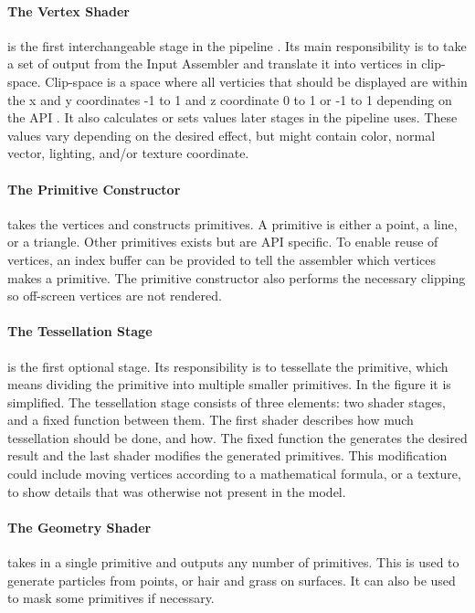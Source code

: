 \paragraph{The Vertex Shader} is the first interchangeable stage in the pipeline .
Its main responsibility is to take a set of output from the Input Assembler and translate it into vertices in clip-space.
Clip-space is a space where all verticies that should be displayed are within the x and y coordinates -1 to 1 and z coordinate 0 to 1 or -1 to 1 depending on the \gls{API} .
It also calculates or sets values later stages in the pipeline uses.
These values vary depending on the desired effect, but might contain color, normal vector, lighting, and/or texture coordinate.

\paragraph{The Primitive Constructor} takes the vertices and constructs primitives.
A primitive is either a point, a line, or a triangle.
Other primitives exists but are \gls{API} specific.
To enable reuse of vertices, an index buffer can be provided to tell the assembler which vertices makes a primitive.
The primitive constructor also performs the necessary clipping so off-screen vertices are not rendered.

\paragraph{The Tessellation Stage} is the first optional stage.
Its responsibility is to tessellate the primitive, which means dividing the primitive into multiple smaller primitives.
In the figure it is simplified.
The tessellation stage consists of three elements: two shader stages, and a fixed function between them.
The first shader describes how much tessellation should be done, and how.
The fixed function the generates the desired result and the last shader modifies the generated primitives.
This modification could include moving vertices according to a mathematical formula, or a texture, to show details that was otherwise not present in the model.

\paragraph{The Geometry Shader} takes in a single primitive and outputs any number of primitives.
This is used to generate particles from points, or hair and grass on surfaces.
It can also be used to mask some primitives if necessary.


